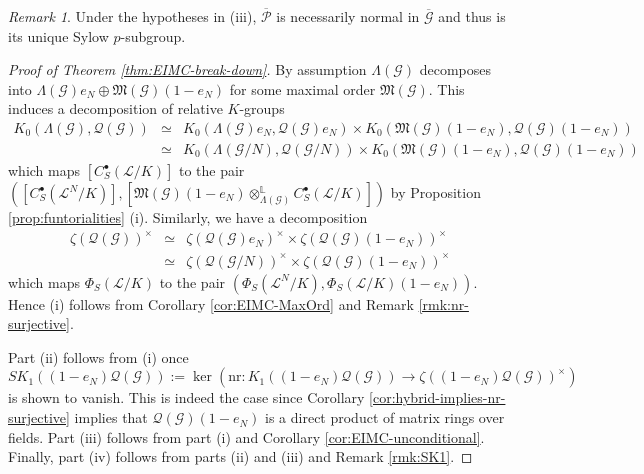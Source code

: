 \documentclass[12pt]{amsart}
\theoremstyle{plain}
\theoremstyle{remark}
\newtheorem{remark}[theorem]{Remark}
\theoremstyle{definition}
\numberwithin{equation}{section}
\begin{document}
\begin{remark}
Under the hypotheses in (iii), $\overline{\mathcal{P}}$ is necessarily normal in $\overline{\mathcal{G}}$
and thus is its unique Sylow $p$-subgroup.
\end{remark}

\begin{proof}[Proof of Theorem \ref{thm:EIMC-break-down}]
By assumption $\Lambda(\mathcal{G})$ decomposes into $\Lambda(\mathcal{G}) e_{N} \oplus \mathfrak{M}(\mathcal{G}) (1 - e_{N})$
for some maximal order $\mathfrak{M}(\mathcal{G})$. This induces a decomposition of relative $K$-groups
\begin{eqnarray*}
K_{0}(\Lambda(\mathcal{G}), \mathcal{Q}(\mathcal{G}))
& \simeq & K_{0}(\Lambda(\mathcal{G}) e_{N}, \mathcal{Q}(\mathcal{G}) e_{N}) \times K_{0}(\mathfrak{M}(\mathcal{G}) (1 - e_{N}), \mathcal{Q}(\mathcal{G}) (1-e_{N}))\\
 & \simeq & K_{0}(\Lambda(\mathcal{G}/N), \mathcal{Q}(\mathcal{G}/N)) \times K_{0}(\mathfrak{M}(\mathcal{G}) (1 - e_{N}), \mathcal{Q}(\mathcal{G}) (1-e_{N}))
\end{eqnarray*}
which maps $[C_{S}^{\bullet}(\mathcal{L}/K)]$ to the pair
$([C_{S}^{\bullet}(\mathcal{L}^{N}/K)], [\mathfrak{M}(\mathcal{G}) (1 - e_{N}) \otimes_{\Lambda(\mathcal{G})}^{\mathbb{L}} C_{S}^{\bullet}(\mathcal{L}/K)])$
by Proposition \ref{prop:funtorialities} (i).
Similarly, we have a decomposition
\begin{eqnarray*}
\zeta(\mathcal{Q}(\mathcal{G}))^{\times} & \simeq & \zeta(\mathcal{Q}(\mathcal{G}) e_{N})^{\times} \times \zeta(\mathcal{Q}(\mathcal{G})(1-e_{N}))^{\times} \\
& \simeq & \zeta(\mathcal{Q}(\mathcal{G}/N))^{\times} \times \zeta(\mathcal{Q}(\mathcal{G})(1-e_{N}))^{\times}
\end{eqnarray*}
which maps $\Phi_{S}(\mathcal{L}/K)$ to the pair $(\Phi_{S}(\mathcal{L}^{N}/K), \Phi_{S}(\mathcal{L}/K) (1-e_{N}))$.
Hence (i) follows from Corollary \ref{cor:EIMC-MaxOrd} and Remark \ref{rmk:nr-surjective}.

Part (ii) follows from (i) once
\[
SK_{1}((1-e_{N})\mathcal{Q}(\mathcal{G})) := 
\ker({\mathrm{nr}}: K_{1}((1-e_{N})\mathcal{Q}(\mathcal{G})) \longrightarrow \zeta((1-e_{N})\mathcal{Q}(\mathcal{G}))^{\times})
\]
is shown to vanish.
This is indeed the case since Corollary \ref{cor:hybrid-implies-nr-surjective} implies that $\mathcal{Q}(\mathcal{G})(1-e_{N})$ is a direct product
of matrix rings over fields.
Part (iii) follows from part (i) and Corollary \ref{cor:EIMC-unconditional}.
Finally, part (iv) follows from parts (ii) and (iii) and Remark \ref{rmk:SK1}.
\end{proof}
\end{document}
